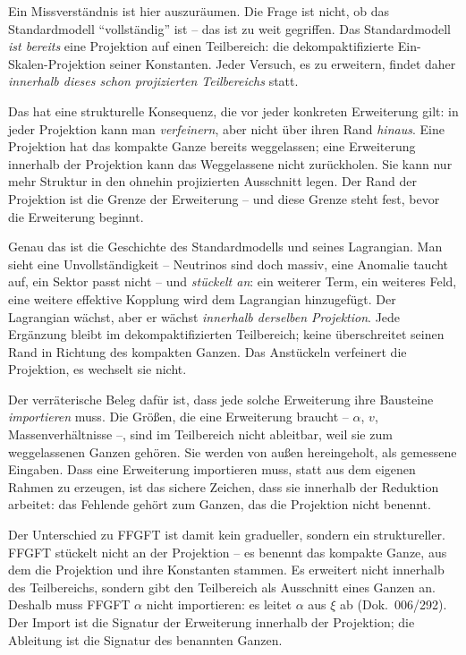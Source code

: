 Ein Missverständnis ist hier auszuräumen. Die Frage ist nicht, ob das
Standardmodell \enquote{vollständig} ist -- das ist zu weit gegriffen. Das
Standardmodell \emph{ist bereits} eine Projektion auf einen Teilbereich: die
dekompaktifizierte Ein-Skalen-Projektion seiner Konstanten. Jeder Versuch,
es zu erweitern, findet daher \emph{innerhalb dieses schon projizierten
Teilbereichs} statt.

Das hat eine strukturelle Konsequenz, die vor jeder konkreten Erweiterung
gilt: in jeder Projektion kann man \emph{verfeinern}, aber nicht über ihren
Rand \emph{hinaus}. Eine Projektion hat das kompakte Ganze bereits
weggelassen; eine Erweiterung innerhalb der Projektion kann das Weggelassene
nicht zurückholen. Sie kann nur mehr Struktur in den ohnehin projizierten
Ausschnitt legen. Der Rand der Projektion ist die Grenze der Erweiterung --
und diese Grenze steht fest, bevor die Erweiterung beginnt.

Genau das ist die Geschichte des Standardmodells und seines Lagrangian. Man
sieht eine Unvollständigkeit -- Neutrinos sind doch massiv, eine Anomalie
taucht auf, ein Sektor passt nicht -- und \emph{stückelt an}: ein weiterer
Term, ein weiteres Feld, eine weitere effektive Kopplung wird dem Lagrangian
hinzugefügt. Der Lagrangian wächst, aber er wächst \emph{innerhalb derselben
Projektion}. Jede Ergänzung bleibt im dekompaktifizierten Teilbereich; keine
überschreitet seinen Rand in Richtung des kompakten Ganzen. Das
Anstückeln verfeinert die Projektion, es wechselt sie nicht.

Der verräterische Beleg dafür ist, dass jede solche Erweiterung ihre
Bausteine \emph{importieren} muss. Die Größen, die eine Erweiterung braucht
-- $\alpha$, $v$, Massenverhältnisse --, sind im Teilbereich nicht ableitbar,
weil sie zum weggelassenen Ganzen gehören. Sie werden von außen
hereingeholt, als gemessene Eingaben. Dass eine Erweiterung importieren muss,
statt aus dem eigenen Rahmen zu erzeugen, ist das sichere Zeichen, dass sie
innerhalb der Reduktion arbeitet: das Fehlende gehört zum Ganzen, das die
Projektion nicht benennt.

Der Unterschied zu FFGFT ist damit kein gradueller, sondern ein
struktureller. FFGFT stückelt nicht an der Projektion -- es benennt das
kompakte Ganze, aus dem die Projektion und ihre Konstanten stammen. Es
erweitert nicht innerhalb des Teilbereichs, sondern gibt den Teilbereich als
Ausschnitt eines Ganzen an. Deshalb muss FFGFT $\alpha$ nicht importieren:
es leitet $\alpha$ aus $\xi$ ab (Dok.~006/292). Der Import ist die Signatur
der Erweiterung innerhalb der Projektion; die Ableitung ist die Signatur des
benannten Ganzen.


